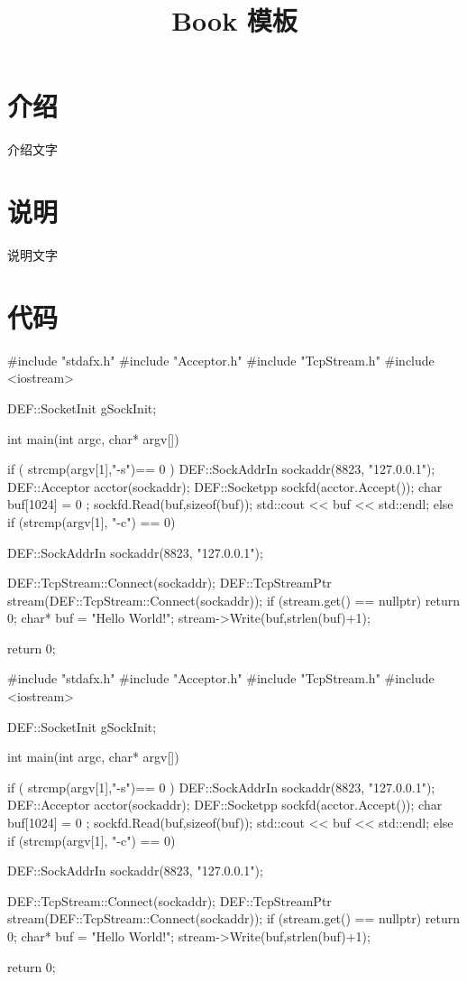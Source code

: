 \documentclass[10pt,fontset=adobe,UTF8]{ctexbook}
\title{Book 模板}
\begin{document}
\frontmatter
\maketitle

\tableofcontents
    
\mainmatter

\chapter{介绍}

介绍文字

\chapter{说明}

说明文字

\chapter{代码}

\begin{Code}
#include "stdafx.h"
#include "Acceptor.h"
#include "TcpStream.h"
#include <iostream>
 
DEF::SocketInit gSockInit;
 
 
int main(int argc, char* argv[])
{
    if ( strcmp(argv[1],"-s")== 0 )
    {
        DEF::SockAddrIn sockaddr(8823, "127.0.0.1");
        DEF::Acceptor acctor(sockaddr);
        DEF::Socketpp sockfd(acctor.Accept());
        char buf[1024] = { 0 };
        sockfd.Read(buf,sizeof(buf));
        std::cout << buf << std::endl;
    }
    else if (strcmp(argv[1], "-c") == 0)
    {
        DEF::SockAddrIn sockaddr(8823, "127.0.0.1");
 
        DEF::TcpStream::Connect(sockaddr);
        DEF::TcpStreamPtr stream(DEF::TcpStream::Connect(sockaddr));
        if (stream.get() == nullptr)
            return 0;
        char* buf = "Hello World!";
        stream->Write(buf,strlen(buf)+1);
    }
 
     
    return 0;
}
\end{Code}

\begin{Codex}
#include "stdafx.h"
#include "Acceptor.h"
#include "TcpStream.h"
#include <iostream>
 
DEF::SocketInit gSockInit;
 
 
int main(int argc, char* argv[])
{
    if ( strcmp(argv[1],"-s")== 0 )
    {
        DEF::SockAddrIn sockaddr(8823, "127.0.0.1");
        DEF::Acceptor acctor(sockaddr);
        DEF::Socketpp sockfd(acctor.Accept());
        char buf[1024] = { 0 };
        sockfd.Read(buf,sizeof(buf));
        std::cout << buf << std::endl;
    }
    else if (strcmp(argv[1], "-c") == 0)
    {
        DEF::SockAddrIn sockaddr(8823, "127.0.0.1");
 
        DEF::TcpStream::Connect(sockaddr);
        DEF::TcpStreamPtr stream(DEF::TcpStream::Connect(sockaddr));
        if (stream.get() == nullptr)
            return 0;
        char* buf = "Hello World!";
        stream->Write(buf,strlen(buf)+1);
    }
 
     
    return 0;
}
\end{Codex}
\end{document}

